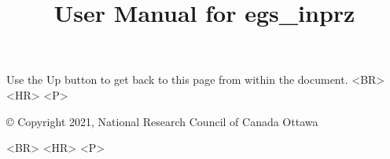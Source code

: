 \documentclass[12pt,twoside]{article}   %
\begin{document}

\setlength{\baselineskip}{0.5cm}


\begin{htmlonly}



\begin{rawhtml}
Use the Up button to get back to this page from within the document.
<BR> <HR> <P>
\end{rawhtml}

\copyright
Copyright 2021, National Research Council of Canada
Ottawa

\begin{rawhtml}
<BR> <HR> <P>
\end{rawhtml}

\end{htmlonly}

\pagestyle{empty}

\title{User Manual for egs\_inprz}
\end{document}
